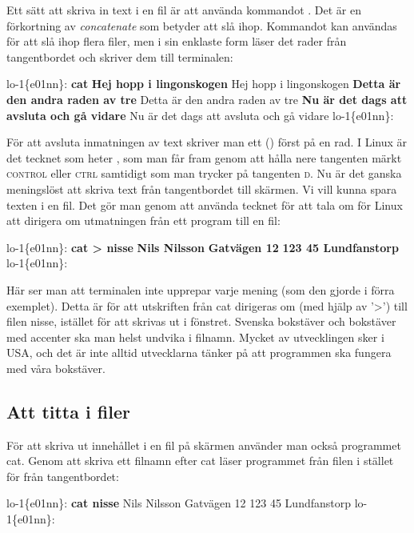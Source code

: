 \documentclass[a4paper,twocolumn]{book}
\begin{document}
Ett sätt att skriva in text i en fil är att använda kommandot
. Det är en förkortning av \emph{concatenate} som betyder
att slå ihop. Kommandot kan användas för att slå ihop flera filer, men
i sin enklaste form läser det rader från tangentbordet och skriver dem
till terminalen:
\begin{example}
  lo-1\{e01nn\}: \textbf{cat}
  \textbf{Hej hopp i lingonskogen}
  Hej hopp i lingonskogen
  \textbf{Detta är den andra raden av tre}
  Detta är den andra raden av tre
  \textbf{Nu är det dags att avsluta och gå vidare}
  Nu är det dags att avsluta och gå vidare
  \textbf{}
  lo-1\{e01nn\}:
\end{example}
För att avsluta inmatningen av text skriver man ett
 () först på en rad. I
Linux är det tecknet som heter , som man får fram genom att
hålla nere tangenten märkt\label{control} \textsc{control} eller
\textsc{ctrl} samtidigt som man trycker på tangenten \textsc{d}.
Nu är det ganska meningslöst att skriva text från tangentbordet till
skärmen. Vi vill kunna spara texten i en fil. Det gör man genom att
använda tecknet \ttindex{>} för att tala om för Linux att dirigera om
utmatningen från ett program till en fil:
\begin{example}
  lo-1\{e01nn\}: \textbf{cat > nisse}
  \textbf{Nils Nilsson}
  \textbf{Gatvägen 12}
  \textbf{123 45 Lundfanstorp}
  \textbf{}
  lo-1\{e01nn\}:
\end{example}
Här ser man att terminalen inte upprepar varje mening (som den gjorde i förra exemplet). Detta är för att
utskriften från cat dirigeras om (med hjälp av '>') till filen nisse, istället för att skrivas ut i fönstret.
Svenska bokstäver och bokstäver med accenter
ska man helst undvika i filnamn. Mycket av utvecklingen sker i USA, och det är
inte alltid utvecklarna tänker på att programmen ska fungera med våra
bokstäver.


\subsection{Att titta i filer}

För att skriva ut innehållet i en fil på skärmen använder man också
programmet cat. Genom att skriva ett filnamn efter cat läser
programmet från filen i stället för från tangentbordet:
\begin{example}
  lo-1\{e01nn\}: \textbf{cat nisse}
  Nils Nilsson
  Gatvägen 12
  123 45 Lundfanstorp
  lo-1\{e01nn\}:
\end{example}
\end{document}
